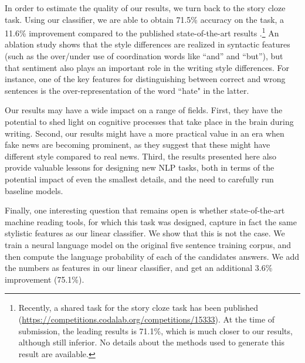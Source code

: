 \documentclass[11pt,a4paper]{article}
\newcommand{\secref}[1]{Section~\ref{ssec:#1}}
\newcommand{\com}[1]{}
\begin{document}
In order to estimate the quality of our results, we turn back to the story cloze task.
Using our classifier, we are able to obtain 71.5\% accuracy on the task, a 11.6\% improvement compared to the published state-of-the-art results \cite{Salle:2016}.\footnote{Recently, a shared task for the story cloze task has been published (\url{https://competitions.codalab.org/competitions/15333}). 
At the time of submission, the leading results is 71.1\%, which is much closer to our results, although still inferior.
No details about the methods used to generate this result are available.}
An ablation study shows that the style differences are realized in syntactic features (such as the over/under use of coordination words like ``and'' and ``but''),
but that sentiment also plays an important role in the writing style differences.
For instance, one of the key features for distinguishing between correct and wrong sentences is the over-representation of the word ``hate" in the latter.

\com{Our results suggest that writing style is affected by the the writer's state of mind.
Writing a sentence intended to be {\it wrong} turns out quite differently than a sentence intended to be {\it correct}. 
Similarly, writing a sentence as part of the story is different from reading a story, and then writing the final sentence.}

Our results may have a wide impact on a range of fields. 
First, they have the potential to shed light on cognitive processes that take place in the brain during writing.
Second, our results might have a more practical value in an era when fake news are becoming prominent,
as they suggest that these might have different style compared to real news.
Third, the results presented here also provide valuable lessons for designing new NLP tasks,
both in terms of the potential impact of even the smallest details, and the need to carefully run baseline models.

Finally, one interesting question that remains open is whether state-of-the-art machine reading tools, for which this task was designed, 
capture in fact the same stylistic features as our linear classifier. 
We show that this is not the case. 
We train a neural language model on the original five sentence training corpus, and then compute the language probability of each of the candidates answers. 
We add the numbers as features in our linear classifier, and get an additional 3.6\% improvement (75.1\%).
\end{document}
